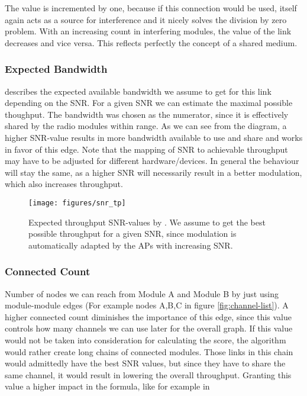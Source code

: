 	The value is incremented by one, because if this connection would be used, itself again acts as a source for interference and it nicely solves the division by zero
	problem. With an increasing count in interfering modules, the value of the link decreases and vice versa. This reflects perfectly the concept of a shared medium.

      \subsubsection{Expected Bandwidth}
	describes the expected available bandwidth we assume to get for this link depending on the \ac{SNR}.
	For a given \ac{SNR} we can estimate the maximal possible thoughput.
	The bandwidth was chosen as the numerator, since it is effectively shared by the radio modules within range.
	As we can see from the diagram, a higher \ac{SNR}-value results in more bandwidth available to use and share and works in favor of this edge.
	Note that the mapping of \ac{SNR} to achievable throughput may have to be adjusted for different hardware/devices. 
	In general the behaviour will stay the same, as a higher \ac{SNR} will necessarily result in a better modulation, which
	also increases throughput.
	
	\begin{figure}[h!]
	  \centering
	  \texttt{[image: figures/snr\_tp]}
	  \caption{Expected throughput \ac{SNR}-values by \cite{expected_snr}. We assume to get the best possible throughput for a given SNR, since 
	    modulation is automatically adapted by the APs with increasing SNR.}
	  \label{fig:snr_tp}
	\end{figure}
	
\newpage
      \subsubsection{Connected Count}
	Number of nodes we can reach from Module A and Module B by just using module-module edges (For example nodes A,B,C in figure \ref{fig:channel-list}). 
	A higher connected count diminishes the importance of this edge, since this value controls how many channels we can use later for the overall graph.
	If this value would not be taken into consideration for calculating the score, the algorithm would rather create long chains of connected modules. 
	Those links in this chain would admittedly have the best \ac{SNR} values, but since they have to share the same channel, 
	it would result in lowering the overall throughput. Granting this value a higher impact in the formula, like for example in 
	
